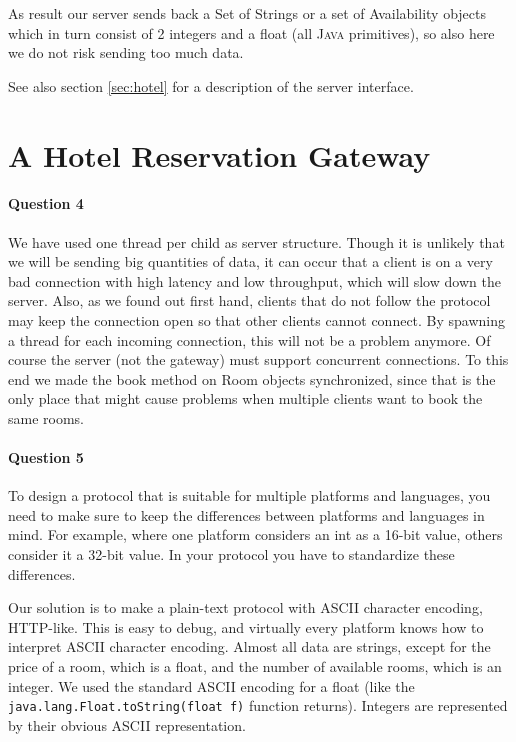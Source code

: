 \documentclass[a4paper,10pt]{article}
\begin{document}
As result our server sends back a Set of Strings or a set of
Availability objects which in turn consist of 2 integers and a float
(all \textsc{Java} primitives), so also here we do not risk sending too much
data.

See also section \ref{sec:hotel} for a description of the server
interface. %

\section{A Hotel Reservation Gateway}
\paragraph{Question 4}
We have used one thread per child as server structure. Though it is
unlikely that we will be sending big quantities of data, it can occur
that a client is on a very bad connection with high latency and low
throughput, which will slow down the server. Also, as we found out
first hand, clients that do not follow the protocol may keep the
connection open so that other clients cannot connect. By spawning a
thread for each incoming connection, this will not be a problem
anymore. Of course the server (not the gateway) must support
concurrent connections. To this end we made the book method on Room
objects synchronized, since that is the only place that might cause
problems when multiple clients want to book the same rooms.

\paragraph{Question 5}
To design a protocol that is suitable for multiple platforms and
languages, you need to make sure to keep the differences between
platforms and languages in mind. For example, where one platform
considers an int as a 16-bit value, others consider it a 32-bit
value. In your protocol you have to standardize these differences.

Our solution is to make a plain-text protocol with \textsc{ASCII}
character
encoding, \textsc{HTTP}-like. This is easy to debug, and virtually every
platform knows how to interpret \textsc{ASCII} character encoding. Almost all
data are strings, except for the price of a room, which is a float,
and the number of available rooms, which is an integer. We
used the standard \textsc{ASCII} encoding for a float (like the
\texttt{java.lang.Float.toString(float f)} function
returns). Integers are represented by their obvious \textsc{ASCII}
representation.
\end{document}
